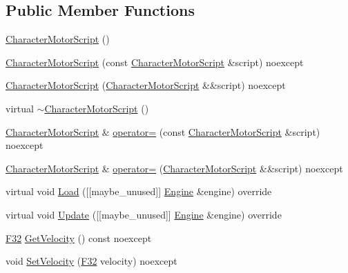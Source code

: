 \subsection*{Public Member Functions}
\begin{DoxyCompactItemize}
\item 
\hyperlink{classmage_1_1script_1_1_character_motor_script_ac5147e7eca438fe01cc0bedb2ce0a750}{Character\+Motor\+Script} ()
\item 
\hyperlink{classmage_1_1script_1_1_character_motor_script_a22c2bc0693a38f12182234ba842aa6f2}{Character\+Motor\+Script} (const \hyperlink{classmage_1_1script_1_1_character_motor_script}{Character\+Motor\+Script} \&script) noexcept
\item 
\hyperlink{classmage_1_1script_1_1_character_motor_script_ad822459ba8d2bbd5a30d598c41c5a281}{Character\+Motor\+Script} (\hyperlink{classmage_1_1script_1_1_character_motor_script}{Character\+Motor\+Script} \&\&script) noexcept
\item 
virtual \hyperlink{classmage_1_1script_1_1_character_motor_script_a83ed3c2fcb60cef046499fd9c44f86ee}{$\sim$\+Character\+Motor\+Script} ()
\item 
\hyperlink{classmage_1_1script_1_1_character_motor_script}{Character\+Motor\+Script} \& \hyperlink{classmage_1_1script_1_1_character_motor_script_aec26db7e08e315cf2461e860b1eaee4e}{operator=} (const \hyperlink{classmage_1_1script_1_1_character_motor_script}{Character\+Motor\+Script} \&script) noexcept
\item 
\hyperlink{classmage_1_1script_1_1_character_motor_script}{Character\+Motor\+Script} \& \hyperlink{classmage_1_1script_1_1_character_motor_script_a284b9ecfd595278062cf3a16ebd90f43}{operator=} (\hyperlink{classmage_1_1script_1_1_character_motor_script}{Character\+Motor\+Script} \&\&script) noexcept
\item 
virtual void \hyperlink{classmage_1_1script_1_1_character_motor_script_a20699adf280bed4bfadd4a89d7df33c1}{Load} (\mbox{[}\mbox{[}maybe\+\_\+unused\mbox{]}\mbox{]} \hyperlink{classmage_1_1_engine}{Engine} \&engine) override
\item 
virtual void \hyperlink{classmage_1_1script_1_1_character_motor_script_ae738c9550e17be133291ccd2a6681368}{Update} (\mbox{[}\mbox{[}maybe\+\_\+unused\mbox{]}\mbox{]} \hyperlink{classmage_1_1_engine}{Engine} \&engine) override
\item 
\hyperlink{namespacemage_aa97e833b45f06d60a0a9c4fc22ae02c0}{F32} \hyperlink{classmage_1_1script_1_1_character_motor_script_a24edb3337af40e7326c424bc6b93c3fa}{Get\+Velocity} () const noexcept
\item 
void \hyperlink{classmage_1_1script_1_1_character_motor_script_a51c9b8317670fc0ae554bfb0cac11aee}{Set\+Velocity} (\hyperlink{namespacemage_aa97e833b45f06d60a0a9c4fc22ae02c0}{F32} velocity) noexcept
\end{DoxyCompactItemize}
